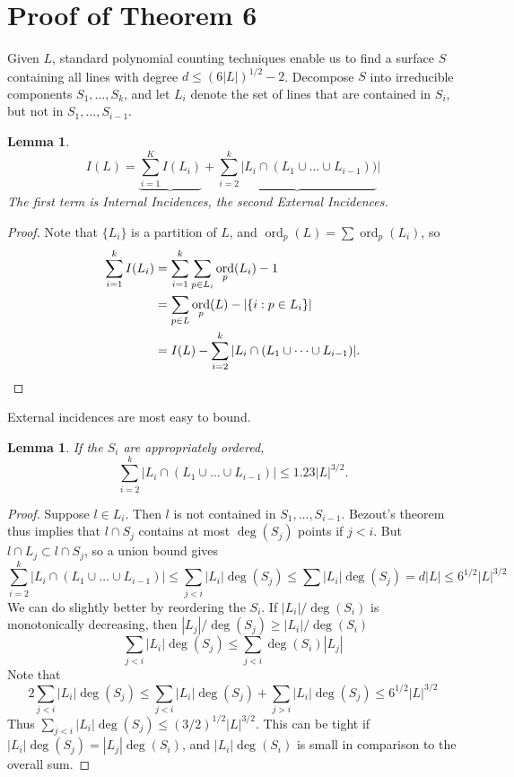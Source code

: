 \documentclass{article}
\theoremstyle{plain}
\newtheorem{lemma}[theorem]{Lemma}
\theoremstyle{remark}
\theoremstyle{definition}
\DeclareMathOperator{\ord}{\text{ord}}
\begin{document}
\section{Proof of Theorem 6}

Given $L$, standard polynomial counting techniques enable us to find a surface $S$ containing all lines with degree $d \leq (6|L|)^{1/2} - 2$. Decompose $S$ into irreducible components $S_1, \dots, S_k$, and let $L_i$ denote the set of lines that are contained in $S_i$, but not in $S_1, \dots, S_{i-1}$.

\begin{lemma}
    \[ I(L) = \underbrace{\sum_{i = 1}^K I(L_i)} + \underbrace{\sum_{i = 2}^k |L_i \cap (L_1 \cup \dots \cup L_{i-1}))}| \]
    The first term is {\it Internal Incidences}, the second {\it External Incidences}.
\end{lemma}
\begin{proof}
    Note that $\{ L_i \}$ is a partition of $L$, and $\ord_p(L) = \sum \ord_p(L_i)$, so
    \begin{align*}
        \sum_{i = 1}^k I(L_i) &= \sum_{i = 1}^k \sum_{p \in L_i} \ord_p(L_i) - 1\\
        &= \sum_{p \in L} \ord_p(L) - |\{ i: p \in L_i \}|\\
        &= I(L) - \sum_{i = 2}^k |L_i \cap (L_1 \cup \dots \cup L_{i-1})|. \qedhere
    \end{align*}
\end{proof}

External incidences are most easy to bound.

\begin{lemma}
    If the $S_i$ are appropriately ordered,
    \[ \sum_{i = 2}^k |L_i \cap (L_1 \cup \dots \cup L_{i-1})| \leq 1.23 |L|^{3/2}. \]
\end{lemma}
\begin{proof}
    Suppose $l \in L_i$. Then $l$ is not contained in $S_1, \dots, S_{i-1}$. Bezout's theorem thus implies that $l \cap S_j$ contains at most $\deg(S_j)$ points if $j < i$. But $l \cap L_j \subset l \cap S_j$, so a union bound gives
    \[ \sum_{i = 2}^k |L_i \cap (L_1 \cup \dots \cup L_{i-1})| \leq \sum_{j < i} |L_i| \deg(S_j) \leq \sum |L_i| \deg(S_j) = d|L| \leq 6^{1/2} |L|^{3/2} \]
    We can do slightly better by reordering the $S_i$. If $|L_i|/\deg(S_i)$ is monotonically decreasing, then $|L_j|/\deg(S_j) \geq |L_i|/\deg(S_i)$
    \[ \sum_{j < i} |L_i| \deg(S_j) \leq \sum_{j < i} \deg(S_i) |L_j| \]
    Note that
    \[ 2 \sum_{j < i} |L_i| \deg(S_j) \leq \sum_{j < i} |L_i| \deg(S_j) + \sum_{j > i} |L_i| \deg(S_j) \leq 6^{1/2} |L|^{3/2} \]
    Thus $\sum_{j < i} |L_i| \deg(S_j) \leq (3/2)^{1/2} |L|^{3/2}$. This can be tight if $|L_i|\deg(S_j) = |L_j| \deg(S_i)$, and $|L_i|\deg(S_i)$ is small in comparison to the overall sum.
\end{proof}
\end{document}
